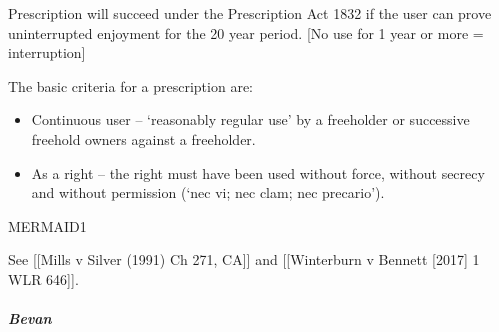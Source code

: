 \documentclass[
]{article}
\newenvironment{Shaded}{}{}
\newcommand{\NormalTok}[1]{#1}
\providecommand{\tightlist}{%
  \setlength{\itemsep}{0pt}\setlength{\parskip}{0pt}}
\begin{document}
\begin{Shaded}
\begin{Highlighting}[]
\NormalTok{Prescription will succeed under the Prescription Act 1832 if the user can prove uninterrupted enjoyment for the 20 year period. [No use for 1 year or more = interruption]}
\end{Highlighting}
\end{Shaded}

The basic criteria for a prescription are:

\begin{itemize}
\tightlist
\item
  Continuous user -- `reasonably regular use' by a freeholder or
  successive freehold owners against a freeholder.
\item
  As a right -- the right must have been used without force, without
  secrecy and without permission (`nec vi; nec clam; nec precario').
\end{itemize}

MERMAID1

See {[}{[}Mills v Silver (1991) Ch 271, CA{]}{]} and {[}{[}Winterburn v
Bennett {[}2017{]} 1 WLR 646{]}{]}.

\hypertarget{bevan}{%
\subparagraph{Bevan}\label{bevan}}
\end{document}
